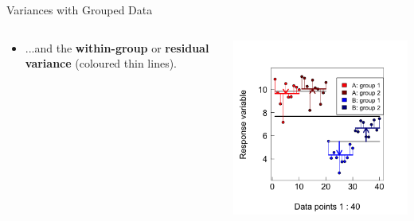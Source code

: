 \documentclass{beamer}
\begin{document}
\begin{frame}{Variances with Grouped Data}

\begin{columns}[onlytextwidth] 
    \begin{column}{0.54\textwidth}
  \begin{itemize}
    \item ...and the \textbf{within-group} or \textbf{residual variance} (coloured thin lines).
  \end{itemize}    \end{column}
    \hspace{0.02\textwidth} %
    \begin{column}{0.46\textwidth}
      \begin{center}
        \includegraphics[width=0.999\textwidth]{lectures/day_1_intro_to_mems/figures/unnamed-chunk-26-1.png}
      \end{center}
    \end{column}
  \end{columns}
  
\end{frame}
\end{document}
